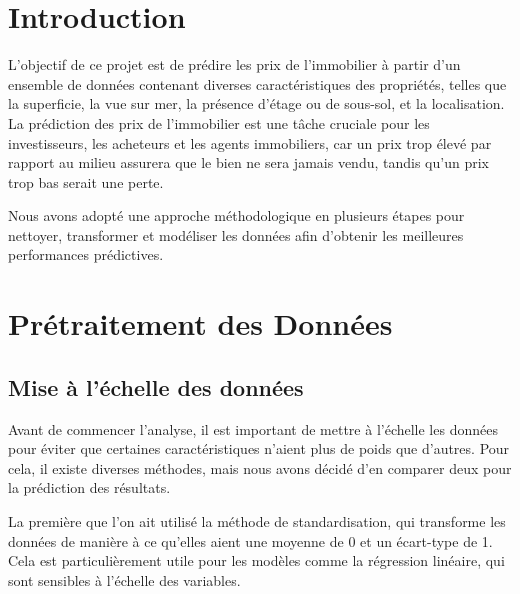 \documentclass[a4paper,12pt,french]{article}
\title{\mytitle}
\begin{document}
\pdg

\cleardoublepage

\tableofcontents
\newpage

\begin{abstract}
Ce rapport présente un projet de prédiction des prix de l'immobilier en utilisant diverses méthodes de traitement des données et d'apprentissage automatique. Nous avons exploré les techniques de mise à l'échelle des données, le calcul des prix au mètre carré, ainsi que des approches de clustering pour segmenter les tranches de prix. Ensuite, nous avons utilisé la régression linéaire et le modèle Random Forest pour effectuer la prédiction des prix de l'immobilier.
\end{abstract}

\section{Introduction}
L'objectif de ce projet est de prédire les prix de l'immobilier à partir d'un ensemble de données contenant diverses caractéristiques des propriétés, telles que la superficie, la vue sur mer, la présence d'étage ou de sous-sol, et la localisation. La prédiction des prix de l'immobilier est une tâche cruciale pour les investisseurs, les acheteurs et les agents immobiliers, car un prix trop élevé par rapport au milieu assurera que le bien ne sera jamais vendu, tandis qu'un prix trop bas serait une perte.

Nous avons adopté une approche méthodologique en plusieurs étapes pour nettoyer, transformer et modéliser les données afin d'obtenir les meilleures performances prédictives.

\section{Prétraitement des Données}

\subsection{Mise à l'échelle des données}
Avant de commencer l'analyse, il est important de mettre à l'échelle les données pour éviter que certaines caractéristiques n'aient plus de poids que d'autres. Pour cela, il existe diverses méthodes, mais nous avons décidé d'en comparer deux pour la prédiction des résultats.

La première que l'on ait utilisé la méthode de standardisation, qui transforme les données de manière à ce qu'elles aient une moyenne de 0 et un écart-type de 1. Cela est particulièrement utile pour les modèles comme la régression linéaire, qui sont sensibles à l'échelle des variables.
\end{document}
